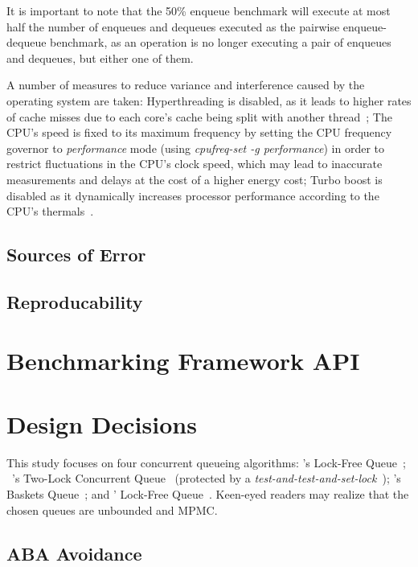 It is important to note that the 50\% enqueue benchmark will execute at most
half the number of enqueues and dequeues executed as the pairwise
enqueue-dequeue benchmark, as an operation is no longer executing a pair of
enqueues and dequeues, but either one of them.

A number of measures to reduce variance and
interference caused by the operating system are taken: Hyperthreading is
disabled, as it leads to higher rates of cache misses due to each core's cache
being split with another thread~\citep{fog2020optimizing}; The CPU's speed is
fixed to its maximum frequency by setting the CPU frequency governor to
\emph{performance} mode (using \emph{cpufreq-set -g performance}) in order to
restrict fluctuations in the CPU's clock speed, which may lead to inaccurate
measurements and delays at the cost of a higher energy cost; Turbo boost is disabled as it dynamically increases
processor performance according to the CPU's thermals~\citep[Section~14.3.3]{intel2021system}.

\subsection{Sources of Error}
\subsection{Reproducability}
\section{Benchmarking Framework API}

\section{Design Decisions}
This study focuses on four concurrent queueing algorithms:
\citeauthor{michael1996simple}'s Lock-Free Queue~\citep{michael1996simple};
~\citeauthor{michael1996simple}'s Two-Lock Concurrent
Queue~\citep{michael1996simple} (protected by a \emph{test-and-test-and-set-lock}~\citep{mellor1991algorithms}); \citeauthor{hoffman2007baskets}'s Baskets
Queue~\citep{hoffman2007baskets}; and \citeauthor{valois1994queues}' Lock-Free
Queue~\citep{valois1994queues}. Keen-eyed readers may realize that the chosen
queues are unbounded and MPMC.

\subsection{ABA Avoidance}

